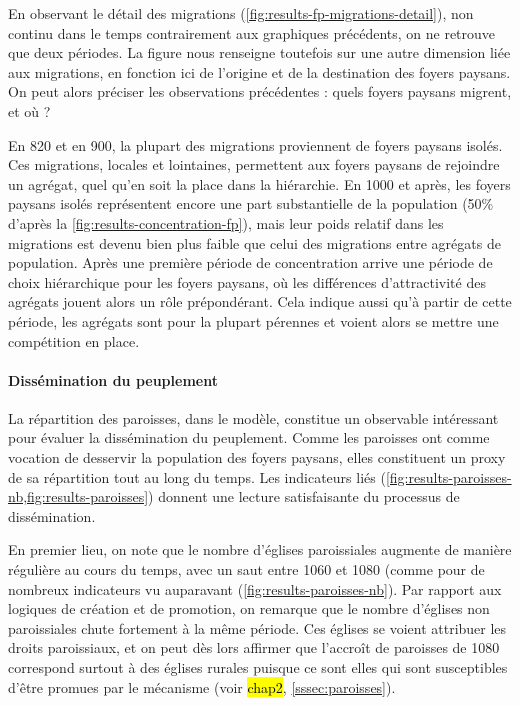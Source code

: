 En observant le détail des migrations (\cref{fig:results-fp-migrations-detail}), non continu dans le temps contrairement aux graphiques précédents, on ne retrouve que deux périodes.
La figure nous renseigne toutefois sur une autre dimension liée aux migrations, en fonction ici de l'origine et de la destination des foyers paysans.
On peut alors préciser les observations précédentes : quels foyers paysans migrent, et où ?

En 820 et en 900, la plupart des migrations proviennent de foyers paysans isolés.
Ces migrations, locales et lointaines, permettent aux foyers paysans de rejoindre un agrégat, quel qu'en soit la place dans la hiérarchie.
En 1000 et après, les foyers paysans isolés représentent encore une part substantielle de la population (50\% d'après la \cref{fig:results-concentration-fp}), mais leur poids relatif dans les migrations est devenu bien plus faible que celui des migrations entre agrégats de population.
Après une première période de concentration arrive une période de choix hiérarchique pour les foyers paysans, où les différences d'attractivité des agrégats jouent alors un rôle prépondérant.
Cela indique aussi qu'à partir de cette période, les agrégats sont pour la plupart pérennes et voient alors se mettre une compétition en place.

\paragraph{Dissémination du peuplement}

La répartition des paroisses, dans le modèle, constitue un observable intéressant pour évaluer la dissémination du peuplement.
Comme les paroisses ont comme vocation de desservir la population des foyers paysans, elles constituent un proxy de sa répartition tout au long du temps.
Les indicateurs liés (\cref{fig:results-paroisses-nb,fig:results-paroisses}) donnent une lecture satisfaisante du processus de dissémination.

En premier lieu, on note que le nombre d'églises paroissiales augmente de manière régulière au cours du temps, avec un saut entre 1060 et 1080 (comme pour de nombreux indicateurs vu auparavant (\cref{fig:results-paroisses-nb}).
Par rapport aux logiques de création et de promotion, on remarque que le nombre d'églises non paroissiales chute fortement à la même période.
Ces églises se voient attribuer les droits paroissiaux, et on peut dès lors affirmer que l'accroît de paroisses de 1080 correspond surtout à des églises rurales puisque ce sont elles qui sont susceptibles d'être promues par le mécanisme (voir \hl{chap2}, \cref{sssec:paroisses}).

